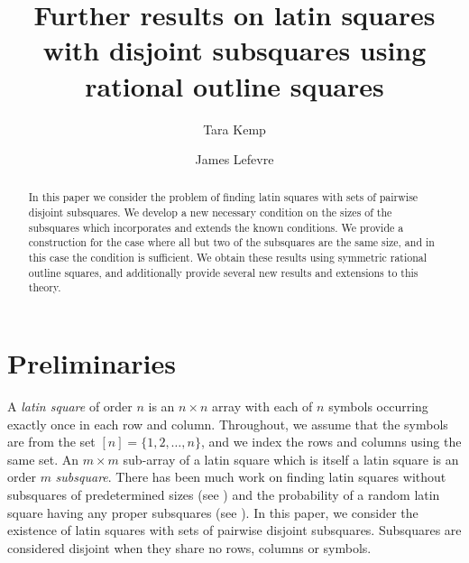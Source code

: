 \documentclass[preprint,nonatbib]{elsarticle}
\theoremstyle{definition}
\numberwithin{equation}{section}
\begin{document}
\title{Further results on latin squares with disjoint subsquares using rational outline squares}

\author[1]{Tara Kemp}
\author[1]{James Lefevre}




\begin{abstract}
    In this paper we consider the problem of finding latin squares with sets of pairwise disjoint subsquares. We develop a new necessary condition on the sizes of the subsquares which incorporates and extends the known conditions. We provide a construction for the case where all but two of the subsquares are the same size, and in this case the condition is sufficient. We obtain these results using symmetric rational outline squares, and additionally provide several new results and extensions to this theory.
\end{abstract}

\maketitle


\section{Preliminaries}

A \emph{latin square} of order $n$ is an $n\times n$ array with each of $n$ symbols occurring exactly once in each row and column. Throughout, we assume that the symbols are from the set $[n] = \{1,2,\dots,n\}$, and we index the rows and columns using the same set. An $m\times m$ sub-array of a latin square which is itself a latin square is an order $m$ \emph{subsquare}. There has been much work on finding latin squares without subsquares of predetermined sizes (see \cite{allsop2023latin}) and the probability of a random latin square having any proper subsquares (see \cite{gill2024canonical}). In this paper, we consider the existence of latin squares with sets of pairwise disjoint subsquares. Subsquares are considered disjoint when they share no rows, columns or symbols.
\end{document}
